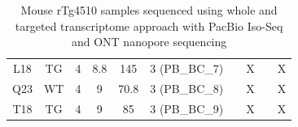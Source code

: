 \begin{landscape}
\begin{table}[]
{\begin{tabular}{@{}cccccccccc@{}}
		L18 & TG & 4 & 8.8 & 145  & 3 (PB\_BC\_7) &                 & X               &                  & X                \\
		Q23 & WT & 4 & 9   & 70.8 & 3 (PB\_BC\_8) &                 & X               &                  & X                \\
		T18 & TG & 4 & 9   & 85   & 3 (PB\_BC\_9) &                 & X               &                  & X                \\ \bottomrule
	\end{tabular}%
}
\captionsetup{width=1.5\textwidth}
\caption[Mouse rTg4510 samples sequenced using whole and targeted transcriptome approach with PacBio Iso-Seq and ONT nanopore sequencing]%
{Mouse rTg4510 samples sequenced using whole and targeted transcriptome approach with PacBio Iso-Seq and ONT nanopore sequencing}
\label{tab:mouse_samples_sequenced}
\end{table}
\end{landscape}


